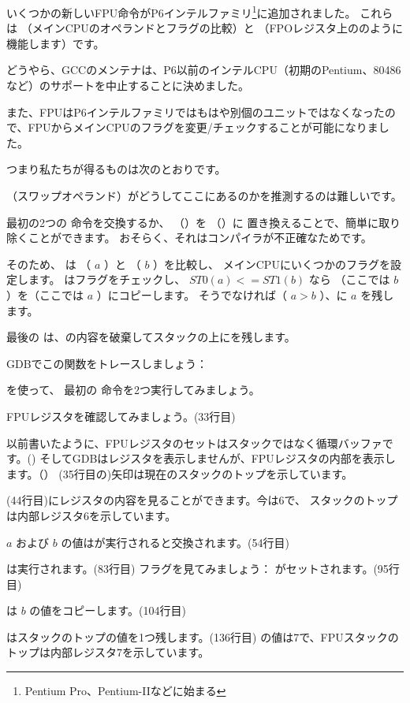 ﻿
\label{gcc481_o3}

いくつかの新しいFPU命令がP6インテルファミリ\footnote{Pentium Pro、Pentium-IIなどに始まる}に追加されました。 
これらは  （メインCPUのオペランドとフラグの比較）と
 （FPOレジスタ上ののように機能します）です。

どうやら、GCCのメンテナは、P6以前のインテルCPU（初期のPentium、80486など）のサポートを中止することに決めました。

また、FPUはP6インテルファミリではもはや別個のユニットではなくなったので、FPUからメインCPUのフラグを変更/チェックすることが可能になりました。

つまり私たちが得るものは次のとおりです。



 （スワップオペランド）がどうしてここにあるのかを推測するのは難しいです。

最初の2つの \FLD 命令を交換するか、  （）を  （）に
置き換えることで、簡単に取り除くことができます。 
おそらく、それはコンパイラが不正確なためです。

そのため、  は  （ $a$ ）と （ $b$ ）を比較し、
メインCPUにいくつかのフラグを設定します。 
はフラグをチェックし、 $ST0 (a) <= ST1 (b)$ なら
（ここでは $b$ ）を（ここでは $a$ ）にコピーします。
そうでなければ（ $a>b$ ）、に $a$ を残します。

最後の \FSTP は、の内容を破棄してスタックの上にを残します。

GDBでこの関数をトレースしましょう：



を使って、
最初の \FLD 命令を2つ実行してみましょう。

FPUレジスタを確認してみましょう。(33行目)

以前書いたように、FPUレジスタのセットはスタックではなく循環バッファです。()
そしてGDBはレジスタを表示しませんが、FPUレジスタの内部を表示します。（）
(35行目の)矢印は現在のスタックのトップを示しています。

(44行目)にレジスタの内容を見ることができます。今は6で、
スタックのトップは内部レジスタ6を示しています。

$a$ および $b$ の値はが実行されると交換されます。(54行目)

は実行されます。(83行目)
フラグを見てみましょう： \CF がセットされます。(95行目)

 は $b$ の値をコピーします。(104行目)

\FSTP はスタックのトップの値を1つ残します。(136行目)
の値は7で、FPUスタックのトップは内部レジスタ7を示しています。
